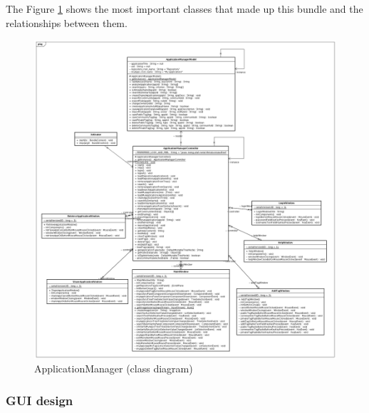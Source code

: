 The Figure \ref{img:am-cd} shows the most important classes that made up this
bundle and the relationships between them.

\begin{figure}[h!]
 \begin{center}
 \includegraphics[scale=0.3]{diagrams/ApplicationManagerClassDiagramSmall.png}
  \caption{\label{img:am-cd}ApplicationManager (class diagram)}
 \end{center}
\end{figure}

\subsubsection{GUI design}

